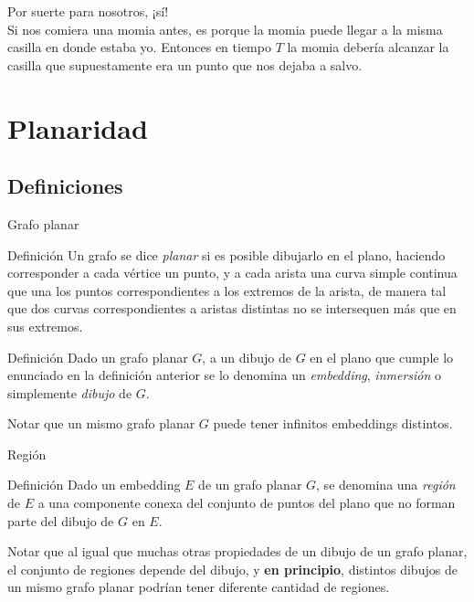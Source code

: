 \documentclass[compress]{beamer}
\newcommand{\bigpause}{\bigskip \pause}
\begin{document}
\begin{frame}
Por suerte para nosotros, ¡sí!\\
Si nos comiera una momia antes, es porque la momia puede llegar a la misma casilla
en donde estaba yo. Entonces en tiempo $T$ la momia debería alcanzar la
casilla que supuestamente era un punto que nos dejaba a salvo. 

\bigpause

\end{frame}

\section{Planaridad}

\subsection{Definiciones}

\begin{frame}{Grafo planar}

\begin{block}{Definición}
    Un grafo se dice \textit{planar} si es posible dibujarlo en el plano, haciendo corresponder a cada vértice un punto, y a cada arista una curva simple continua que una los puntos correspondientes a los extremos de la arista, de manera tal que dos curvas correspondientes a aristas distintas no se intersequen más que en sus extremos.
\end{block}

\begin{block}{Definición}
    Dado un grafo planar $G$, a un dibujo de $G$ en el plano que cumple lo enunciado en la definición anterior se lo denomina un \textit{embedding}, \textit{inmersión} o simplemente \textit{dibujo} de $G$.
\end{block}

Notar que un mismo grafo planar $G$ puede tener infinitos embeddings distintos.

\end{frame}

\begin{frame}{Región}

\begin{block}{Definición}
    Dado un embedding $E$ de un grafo planar $G$, se denomina una \textit{región} de $E$ a una componente conexa del conjunto de puntos del plano que no forman parte del dibujo de $G$ en $E$.
\end{block}

Notar que al igual que muchas otras propiedades de un dibujo de un grafo planar, el conjunto de regiones depende del dibujo, y \textbf{en principio}, distintos dibujos de un mismo grafo planar podrían tener diferente cantidad de regiones.

\end{frame}
\end{document}

